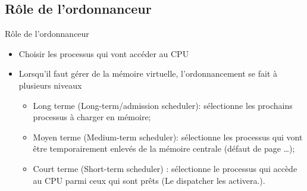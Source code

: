 \begin{frame}{\sectitle}
\def\subsectitle{Rôle de l'ordonnanceur}
\subsection{\subsectitle}

\begin{block}{\subsectitle}
\begin{itemize}
    \item Choisir les processus qui vont accéder au CPU
    \item Lorsqu'il faut gérer de la mémoire virtuelle, l'ordonnancement se
    fait à plusieurs niveaux
    \begin{itemize}
        \item Long terme (Long-term/admission scheduler): sélectionne les prochains
        processus à charger en mémoire;
        \item Moyen terme (Medium-term scheduler): sélectionne les processus qui
        vont être temporairement enlevés de la mémoire centrale (défaut de
        page \dots);
        \item Court terme (Short-term scheduler) : sélectionne le processus qui
        accède au CPU parmi ceux qui sont prêts (Le dispatcher les activera.).
    \end{itemize}
\end{itemize}
\end{block}
\end{frame}

